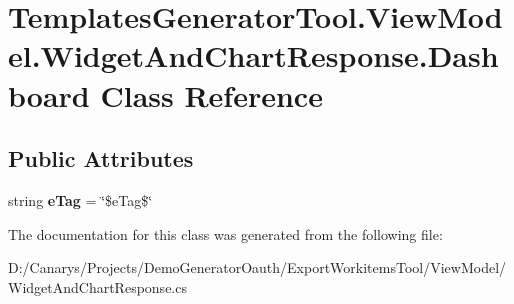 \hypertarget{class_templates_generator_tool_1_1_view_model_1_1_widget_and_chart_response_1_1_dashboard}{}\section{Templates\+Generator\+Tool.\+View\+Model.\+Widget\+And\+Chart\+Response.\+Dashboard Class Reference}
\label{class_templates_generator_tool_1_1_view_model_1_1_widget_and_chart_response_1_1_dashboard}
\subsection*{Public Attributes}
\begin{DoxyCompactItemize}
\item 
\mbox{\label{class_templates_generator_tool_1_1_view_model_1_1_widget_and_chart_response_1_1_dashboard_a44021a2e3ab5a06ab4e240a68490a87a}} 
string {\bfseries e\+Tag} = \char`\"{}\$e\+Tag\$\char`\"{}
\end{DoxyCompactItemize}


The documentation for this class was generated from the following file\+:\begin{DoxyCompactItemize}
\item 
D\+:/\+Canarys/\+Projects/\+Demo\+Generator\+Oauth/\+Export\+Workitems\+Tool/\+View\+Model/Widget\+And\+Chart\+Response.\+cs\end{DoxyCompactItemize}
